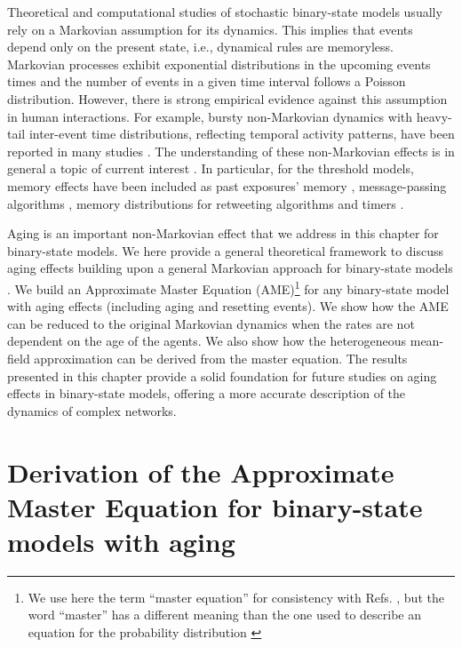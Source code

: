 Theoretical and computational studies of stochastic binary-state models usually rely on a Markovian assumption for its dynamics. This implies that events depend only on the present state, i.e., dynamical rules are memoryless. Markovian processes exhibit exponential distributions in the upcoming events times and the number of events in a given time interval follows a Poisson distribution. However, there is strong empirical evidence against this assumption in human interactions.  For example, bursty non-Markovian dynamics with heavy-tail inter-event time distributions, reflecting temporal activity patterns,  have been reported in many studies \cite{iribarren-2009,karsai-2011,rybski-2012,zignani-2016,artime-2017,kumar-2020}. The understanding of these non-Markovian effects is in general a topic of current interest \cite{van-mieghem-2013,starnini-2017,peralta-2020C,peralta-2020A}. In particular, for the threshold models, memory effects have been included as past exposures' memory \cite{dodds-2004}, message-passing algorithms \cite{shrestha-2014}, memory distributions for retweeting algorithms \cite{gleeson-2016} and timers \cite{oh-2018}.

Aging is an important non-Markovian effect that we address in this chapter for binary-state models. We here provide a general theoretical framework to discuss aging effects building upon a general Markovian approach for binary-state models \cite{gleeson-2011,gleeson-2013}. We build an Approximate Master Equation (AME)\footnote{We use here the term  ``master equation'' for consistency with  Refs. \cite{gleeson-2011,gleeson-2013}, but the word ``master'' has a different meaning than the one used to describe an equation for the probability distribution \cite{toral2014stochastic, peralta-2020B}} for any binary-state model with aging effects (including aging and resetting events). We show how the AME can be reduced to the original Markovian dynamics when the rates are not dependent on the age of the agents. We also show how the heterogeneous mean-field approximation can be derived from the master equation. The results presented in this chapter provide a solid foundation for future studies on aging effects in binary-state models, offering a more accurate description of the dynamics of complex networks. 

\section{Derivation of the Approximate Master Equation for binary-state models with aging \label{sec:Derivation of the Approximate Master Equation for binary-state models with aging}}
    
